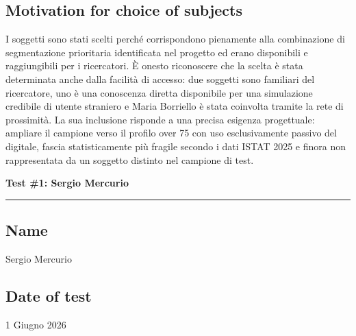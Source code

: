 \documentclass[11pt,a4paper]{article}
\begin{document}
\subsection*{Motivation for choice of subjects}
\begin{tcolorbox}[colback=backgroundColor,colframe=borderColor,arc=2mm]
I soggetti sono stati scelti perché corrispondono pienamente
alla combinazione di segmentazione prioritaria identificata
nel progetto ed erano disponibili e raggiungibili per i
ricercatori. È onesto riconoscere che la scelta è stata
determinata anche dalla facilità di accesso: due soggetti
sono familiari del ricercatore, uno è una conoscenza
diretta disponibile per una simulazione credibile di
utente straniero e Maria Borriello è stata coinvolta
tramite la rete di prossimità. La sua inclusione risponde
a una precisa esigenza progettuale: ampliare il campione
verso il profilo over 75 con uso esclusivamente passivo
del digitale, fascia statisticamente più fragile secondo
i dati ISTAT 2025 e finora non rappresentata da un soggetto
distinto nel campione di test.
\end{tcolorbox}


\newpage
\begin{center}
  {\color{primaryColor}\large\bfseries Test \#1: Sergio Mercurio}\\
  \vspace{0.1cm}
  \color{borderColor}\hrule
\end{center}

\vspace{0.5cm}

\subsection*{Name \normalfont\small\itshape}
\begin{tcolorbox}[colback=backgroundColor,colframe=borderColor,arc=2mm]
Sergio Mercurio
\end{tcolorbox}

\subsection*{Date of test}
\begin{tcolorbox}[colback=backgroundColor,colframe=borderColor,arc=2mm]
1 Giugno 2026
\end{tcolorbox}
\end{document}
